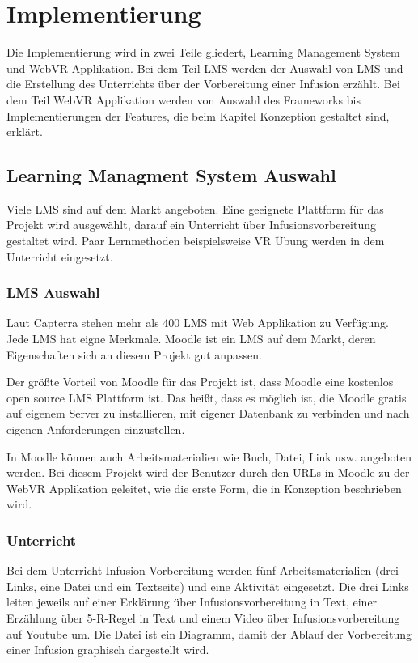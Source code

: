 \chapter{Implementierung}

Die Implementierung wird in zwei Teile gliedert, Learning Management System und  WebVR Applikation. Bei dem Teil LMS werden der Auswahl von LMS und die Erstellung des Unterrichts über der Vorbereitung einer Infusion erzählt. Bei dem Teil WebVR Applikation werden von Auswahl des Frameworks bis Implementierungen der Features, die beim Kapitel Konzeption gestaltet sind, erklärt.

\section{Learning Managment System Auswahl}

Viele LMS sind auf dem Markt angeboten. Eine geeignete Plattform für das Projekt wird ausgewählt, darauf ein Unterricht über Infusionsvorbereitung gestaltet wird. Paar Lernmethoden beispielsweise VR Übung werden in dem Unterricht eingesetzt.

 \subsection{LMS Auswahl}
 Laut Capterra stehen mehr als 400 LMS mit Web Applikation zu Verfügung. Jede LMS hat eigne Merkmale. Moodle ist ein LMS auf dem Markt, deren Eigenschaften sich an diesem Projekt gut anpassen.
 
 Der größte Vorteil von Moodle für das Projekt ist, dass Moodle eine kostenlos open source LMS Plattform ist. Das heißt, dass es möglich ist, die Moodle gratis auf eigenem Server zu installieren, mit eigener Datenbank zu verbinden und nach eigenen Anforderungen einzustellen.
 
 In Moodle können auch Arbeitsmaterialien wie Buch, Datei, Link usw. angeboten werden. Bei diesem Projekt wird der Benutzer durch den URLs in Moodle zu der WebVR Applikation geleitet, wie die erste Form, die in Konzeption beschrieben wird. 
 
 \subsection{Unterricht}
 Bei dem Unterricht Infusion Vorbereitung werden fünf Arbeitsmaterialien (drei Links, eine Datei und ein Textseite) und eine Aktivität eingesetzt. Die drei Links leiten jeweils auf einer Erklärung über Infusionsvorbereitung in Text, einer Erzählung über 5-R-Regel in Text und einem Video über Infusionsvorbereitung auf Youtube um. Die Datei ist ein Diagramm, damit der Ablauf der Vorbereitung einer Infusion graphisch dargestellt wird.
 
